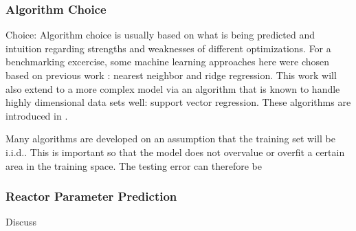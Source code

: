 \subsubsection{Algorithm Choice}
\label{sec:choice}

Choice: Algorithm choice is usually based on what is being predicted and intuition
regarding strengths and weaknesses of different optimizations.  For a
benchmarking excercise, some machine learning approaches here were chosen based
on previous work \cite{dayman_feasibility_2013}: nearest neighbor and ridge
regression. This work will also extend to a more complex model via an algorithm
that is known to handle highly dimensional data sets well: support vector
regression.  These algorithms are introduced in \label{sec:algs}.

Many algorithms are developed on an assumption that the training set will be
\gls{i.i.d.}. This is important so that the model does not overvalue or overfit
a certain area in the training space. The testing error can therefore be

\subsubsection{Reactor Parameter Prediction}
\label{sec:rxtrparam}

Discuss
